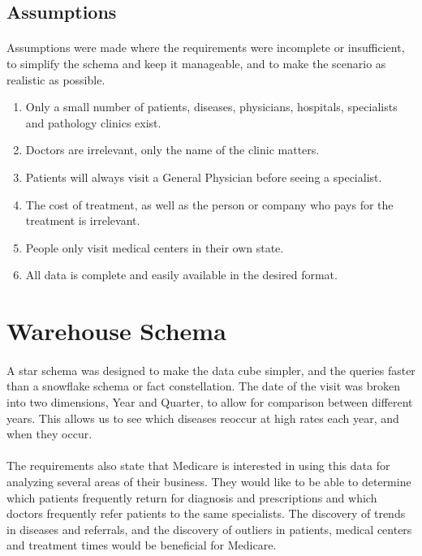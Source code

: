 \documentclass[a4paper,12pt,openany]{report}
\begin{document}
\subsection*{Assumptions}
\paragraph{}
Assumptions were made where the requirements were incomplete or insufficient, to simplify the schema and keep it manageable, and to make the scenario as realistic as possible.
\begin{enumerate}
	\item Only a small number of patients, diseases, physicians, hospitals, specialists and pathology clinics exist.
	\item Doctors are irrelevant, only the name of the clinic matters.
	\item Patients will always visit a General Physician before seeing a specialist.
	\item The cost of treatment, as well as the person or company who pays for the treatment is irrelevant.
	\item People only visit medical centers in their own state.
	\item All data is complete and easily available in the desired format.
\end{enumerate}

\section*{Warehouse Schema}
\paragraph{}
A star schema was designed to make the data cube simpler, and the queries faster than a snowflake schema or fact constellation.
The date of the visit was broken into two dimensions, Year and Quarter, to allow for comparison between different years.
This allows us to see which diseases reoccur at high rates each year, and when they occur.
\paragraph{}
The requirements also state that Medicare is interested in using this data for analyzing several areas of their business.
They would like to be able to determine which patients frequently return for diagnosis and prescriptions and which doctors frequently refer patients to the same specialists.
The discovery of trends in diseases and referrals, and the discovery of outliers in patients, medical centers and treatment times would be beneficial for Medicare.
\end{document}
